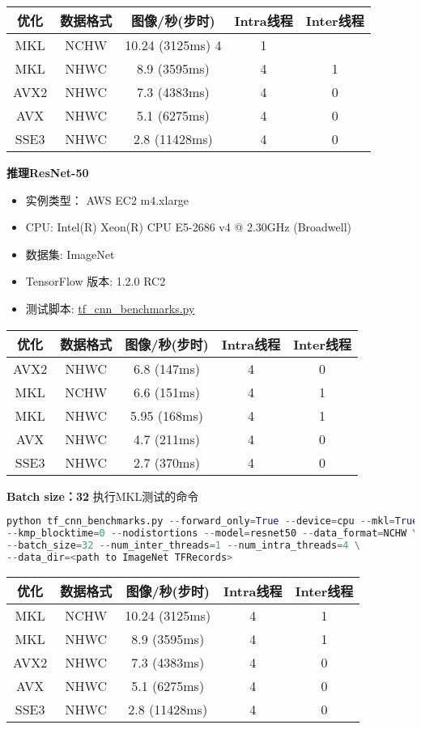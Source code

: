 \begin{tabular}{|c|c|c|c|c|}
\hline
优化&数据格式&图像/秒(步时)&Intra线程&Inter线程\\
\hline
MKL&NCHW&10.24 (3125ms)	4&1\\
\hline
MKL&NHWC&	8.9 (3595ms)&4&1\\
\hline
AVX2&NHWC&7.3 (4383ms)&4&0\\
\hline
AVX&NHWC&5.1 (6275ms)&4&0\\
\hline
SSE3&NHWC&2.8 (11428ms)&4&0\\
\hline
\end{tabular}

\textbf{推理ResNet-50}
\begin{itemize}
	\item 实例类型： AWS EC2 m4.xlarge
	\item CPU: Intel(R) Xeon(R) CPU E5-2686 v4 @ 2.30GHz (Broadwell)
	\item 数据集: ImageNet
	\item TensorFlow 版本: 1.2.0 RC2
	\item 测试脚本: \href{https://github.com/tensorflow/benchmarks/blob/mkl_experiment/scripts/tf_cnn_benchmarks/tf_cnn_benchmarks.py}{tf\_cnn\_benchmarks.py}
\end{itemize}

\begin{tabular}{|c|c|c|c|c|}
优化&数据格式&图像/秒(步时)&Intra线程&Inter线程\\
\hline
AVX2&	NHWC&	6.8 (147ms)&	4&	0\\
\hline
MKL&	NCHW&	6.6 (151ms)&	4&	1\\
\hline
MKL&	NHWC&	5.95 (168ms)&	4&	1\\
\hline
AVX&	NHWC&	4.7 (211ms)&	4&	0\\
\hline
SSE3&	NHWC&	2.7 (370ms)&	4&	0\\
\hline
\end{tabular}

\textbf{Batch size：32}\newline
执行MKL测试的命令
\begin{lstlisting}[language=Python]
python tf_cnn_benchmarks.py --forward_only=True --device=cpu --mkl=True \
--kmp_blocktime=0 --nodistortions --model=resnet50 --data_format=NCHW \
--batch_size=32 --num_inter_threads=1 --num_intra_threads=4 \
--data_dir=<path to ImageNet TFRecords>
\end{lstlisting}

\begin{tabular}{|c|c|c|c|c|}
\hline
优化&数据格式&图像/秒(步时)&Intra线程&Inter线程\\
\hline
MKL&	NCHW&	10.24 (3125ms)&	4&	1\\
\hline
MKL&	NHWC&	8.9 (3595ms)&	4&	1\\
\hline
AVX2&	NHWC&	7.3 (4383ms)&	4&	0\\
\hline
AVX&	NHWC&	5.1 (6275ms)&	4&	0\\
\hline
SSE3&	NHWC&	2.8 (11428ms)&	4&	0\\
\hline
\end{tabular}

